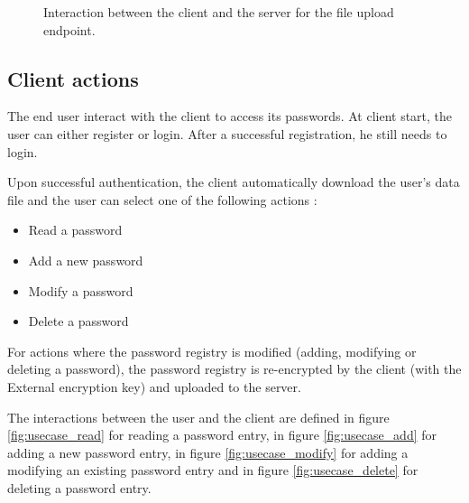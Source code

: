 \documentclass[../report.tex]{subfiles}
\begin{document}
\begin{figure}[h]
 \centering

 \setlength{\fboxsep}{10pt}
 \setlength{\fboxrule}{1pt}

 \caption{Interaction between the client and the server for the file upload endpoint.}
 \label{fig:usecase_upload}
\end{figure}




\subsection{Client actions}
The end user interact with the client to access its passwords.
At client start, the user can either register or login.
After a successful registration, he still needs to login.

Upon successful authentication, the client automatically download the user's data file and the user can select one of the following actions :

\begin{itemize}
 \item Read a password
 \item Add a new password
 \item Modify a password
 \item Delete a password
\end{itemize}

For actions where the password registry is modified (adding, modifying or deleting a password), the password registry is re-encrypted by the client (with the External encryption key) and uploaded to the server.


The interactions between the user and the client are defined in figure \ref{fig:usecase_read} for reading a password entry, in figure \ref{fig:usecase_add} for adding a new password entry, in figure \ref{fig:usecase_modify} for adding a modifying an existing password entry and in figure \ref{fig:usecase_delete} for deleting a password entry.
\end{document}
